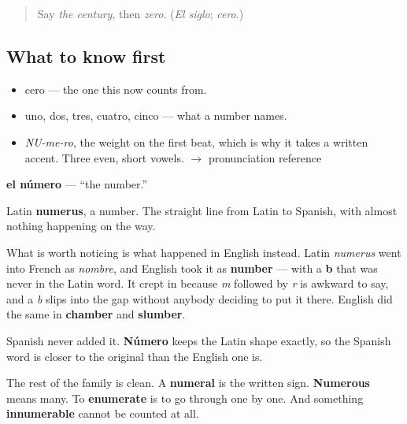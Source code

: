 \label{lesson:ES-C344-numero}



\begin{quote}
Say \emph{the century}, then \emph{zero}. (\emph{El siglo}; \emph{cero}.)
\end{quote}

\subsection*{What to know first}
\begin{itemize}
\raggedright
  \item cero — the one this now counts from.
  \item uno, dos, tres, cuatro, cinco — what a number names.
\end{itemize}

\begin{sounds}
\begin{itemize}
\raggedright
  \item \emph{NU-me-ro}, the weight on the first beat, which is why it takes a written accent. Three even, short vowels. $\to$ pronunciation reference
\end{itemize}
\end{sounds}

\begin{cousinweb}
\textbf{el número} — \textquotedblleft{}the number.\textquotedblright{}

Latin \textbf{numerus}, a number. The straight line from Latin to Spanish, with almost nothing happening on the way.

What is worth noticing is what happened in English instead. Latin \emph{numerus} went into French as \emph{nombre}, and English took it as \textbf{number} — with a \textbf{b} that was never in the Latin word. It crept in because \emph{m} followed by \emph{r} is awkward to say, and a \emph{b} slips into the gap without anybody deciding to put it there. English did the same in \textbf{chamber} and \textbf{slumber}.

Spanish never added it. \textbf{Número} keeps the Latin shape exactly, so the Spanish word is closer to the original than the English one is.

The rest of the family is clean. A \textbf{numeral} is the written sign. \textbf{Numerous} means many. To \textbf{enumerate} is to go through one by one. And something \textbf{innumerable} cannot be counted at all.
\end{cousinweb}

